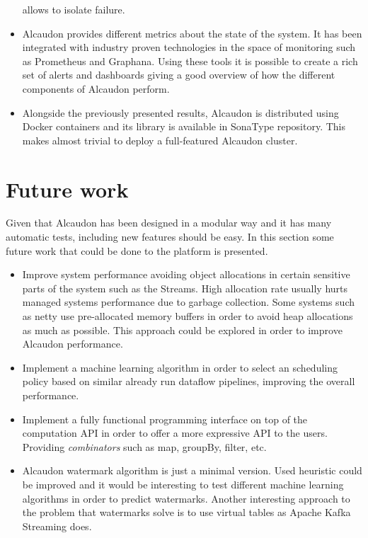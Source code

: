 \begin{itemize}
  allows to isolate failure.
\item Alcaudon provides different metrics about the state of the system. It has been
  integrated with industry proven technologies in the space of monitoring such as
  Prometheus and Graphana. Using these tools it is possible to create a rich set
  of alerts and dashboards giving a good overview of how the different components
  of Alcaudon perform.
\item Alongside the previously presented results, Alcaudon is distributed using Docker
  containers and its library is available in SonaType repository. This makes almost
  trivial to deploy a full-featured Alcaudon cluster.
\end{itemize}

\section{Future work}

Given that Alcaudon has been designed in a modular way and it has many automatic
tests, including new features should be easy. In this section some future work
that could be done to the platform is presented.

\begin{itemize}
\item Improve system performance avoiding object allocations in certain
  sensitive parts of the system such as the Streams. High allocation rate
  usually hurts managed systems performance due to garbage collection. Some
  systems such as netty\cite{https://netty.io/} use pre-allocated memory buffers
  in order to avoid heap allocations as much as possible. This approach could be
  explored in order to improve Alcaudon performance.
\item Implement a machine learning algorithm in order to select an scheduling policy
  based on similar already run dataflow pipelines, improving the overall performance.
\item Implement a fully functional programming interface on top of the
  computation API in order to offer a more expressive API to the users.
  Providing \textit{combinators} such as map, groupBy, filter, etc.
\item Alcaudon watermark algorithm is just a minimal version. Used heuristic
  could be improved and it would be interesting to test different machine
  learning algorithms in order to predict watermarks. Another interesting
  approach to the problem that watermarks solve is to use virtual tables as
  Apache Kafka Streaming does\cite{kafka}.
\end{itemize}
